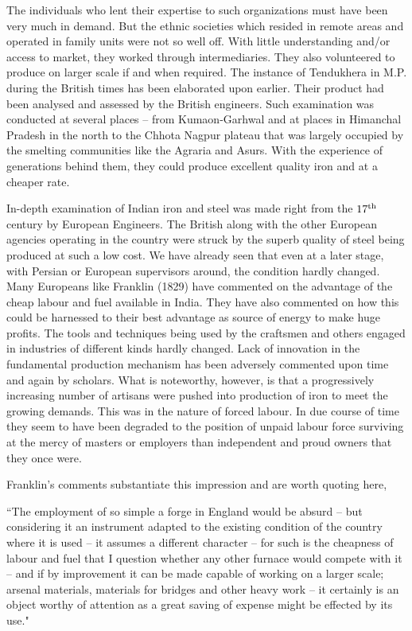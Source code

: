 The individuals who lent their expertise to such organizations must have been very much in demand. But the ethnic societies which resided in remote areas and operated in family units were not so well off. With little understanding and/or access to market, they worked through intermediaries. They also volunteered to produce on larger scale if and when required. The instance of Tendukhera in M.P. during the British times has been elaborated upon earlier. Their product had been analysed and assessed by the British engineers. Such examination was conducted at several places – from Kumaon-Garhwal and at places in Himanchal Pradesh in the north to the Chhota Nagpur plateau that was largely occupied by the smelting communities like the Agraria and Asurs. With the experience of generations behind them, they could produce excellent quality iron and at a cheaper rate. 

In-depth examination of Indian iron and steel was made right from the $17^{\rm th}$ century by European Engineers. The British along with the other European agencies operating in the country were struck by the superb quality of steel being produced at such a low cost. We have already seen that even at a later stage, with Persian or European supervisors around, the condition hardly changed. Many Europeans like Franklin (1829) have commented on the advantage of the cheap labour and fuel available in India. They have also commented on how this could be harnessed to their best advantage as source of energy to make huge profits. The tools and techniques being used by the craftsmen and others engaged in industries of different kinds hardly changed. Lack of innovation in the fundamental production mechanism has been adversely commented upon time and again by scholars. What is noteworthy, however, is that a progressively increasing number of artisans were pushed into production of iron to meet the growing demands. This was in the nature of forced labour. In due course of time they seem to have been degraded to the position of unpaid labour force surviving at the mercy of masters or employers than independent and proud owners that they once were.

Franklin's comments substantiate this impression and are worth quoting here,

{\footnotesize{``The employment of so simple a forge in England would be absurd – but considering it an instrument adapted to the existing condition of the country where it is used – it assumes a different character – for such is the cheapness of labour and fuel that I question whether any other furnace would compete with it – and if by improvement it can be made capable of working on a larger scale; arsenal materials, materials for bridges and other heavy work – it certainly is an object worthy of attention as a great saving of expense might be effected by its use."}} 

